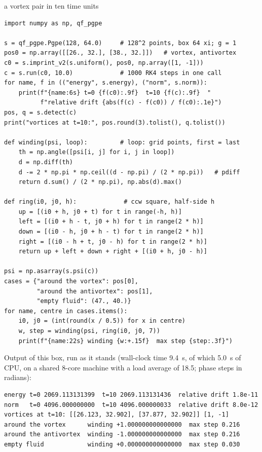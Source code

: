 \begin{rustbox}[unbreakable]{a vortex pair in ten time units}
\begin{lstlisting}[style=py,basicstyle=\ttfamily\footnotesize]
import numpy as np, qf_pgpe

s = qf_pgpe.Pgpe(128, 64.0)     # 128^2 points, box 64 xi; g = 1
pos0 = np.array([[26., 32.], [38., 32.]])   # vortex, antivortex
c0 = s.imprint_v2(s.uniform(), pos0, np.array([1, -1]))
c = s.run(c0, 10.0)             # 1000 RK4 steps in one call
for name, f in (("energy", s.energy), ("norm", s.norm)):
    print(f"{name:6s} t=0 {f(c0):.9f}  t=10 {f(c):.9f}  "
          f"relative drift {abs(f(c) - f(c0)) / f(c0):.1e}")
pos, q = s.detect(c)
print("vortices at t=10:", pos.round(3).tolist(), q.tolist())

def winding(psi, loop):         # loop: grid points, first = last
    th = np.angle([psi[i, j] for i, j in loop])
    d = np.diff(th)
    d -= 2 * np.pi * np.ceil((d - np.pi) / (2 * np.pi))   # pdiff
    return d.sum() / (2 * np.pi), np.abs(d).max()

def ring(i0, j0, h):             # ccw square, half-side h
    up = [(i0 + h, j0 + t) for t in range(-h, h)]
    left = [(i0 + h - t, j0 + h) for t in range(2 * h)]
    down = [(i0 - h, j0 + h - t) for t in range(2 * h)]
    right = [(i0 - h + t, j0 - h) for t in range(2 * h)]
    return up + left + down + right + [(i0 + h, j0 - h)]

psi = np.asarray(s.psi(c))
cases = {"around the vortex": pos[0],
         "around the antivortex": pos[1],
         "empty fluid": (47., 40.)}
for name, centre in cases.items():
    i0, j0 = (int(round(x / 0.5)) for x in centre)
    w, step = winding(psi, ring(i0, j0, 7))
    print(f"{name:22s} winding {w:+.15f}  max step {step:.3f}")
\end{lstlisting}
Output of this box, run as it stands (wall-clock time 9.4~s, of which 5.0~s of CPU, on a shared 8-core machine with a load average of 18.5; phase steps in radians):
\begin{lstlisting}[style=plainmono,basicstyle=\ttfamily\footnotesize]
energy t=0 2069.113131399  t=10 2069.113131436  relative drift 1.8e-11
norm   t=0 4096.000000000  t=10 4096.000000033  relative drift 8.0e-12
vortices at t=10: [[26.123, 32.902], [37.877, 32.902]] [1, -1]
around the vortex      winding +1.000000000000000  max step 0.216
around the antivortex  winding -1.000000000000000  max step 0.216
empty fluid            winding +0.000000000000000  max step 0.030
\end{lstlisting}
\end{rustbox}

